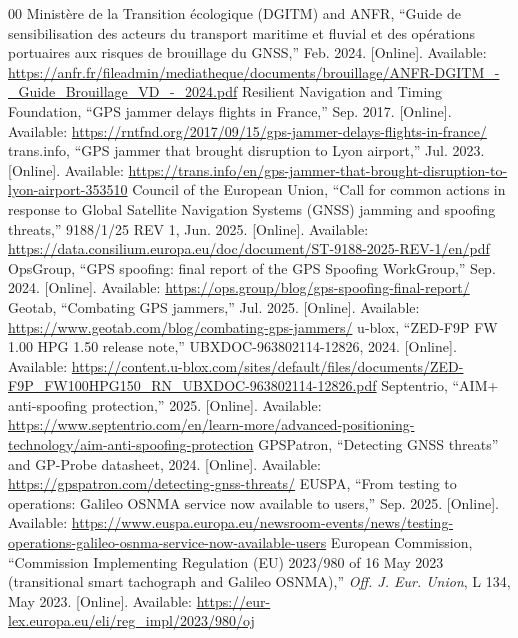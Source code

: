 \documentclass[conference]{IEEEtran}
\begin{document}
\begin{thebibliography}{00}
 Minist\`ere de la Transition \'ecologique (DGITM) and ANFR, ``Guide de sensibilisation des acteurs du transport maritime et fluvial et des op\'erations portuaires aux risques de brouillage du GNSS,'' Feb. 2024. [Online]. Available: \url{https://anfr.fr/fileadmin/mediatheque/documents/brouillage/ANFR-DGITM_-_Guide_Brouillage_VD_-_2024.pdf}
 Resilient Navigation and Timing Foundation, ``GPS jammer delays flights in France,'' Sep. 2017. [Online]. Available: \url{https://rntfnd.org/2017/09/15/gps-jammer-delays-flights-in-france/}
 trans.info, ``GPS jammer that brought disruption to Lyon airport,'' Jul. 2023. [Online]. Available: \url{https://trans.info/en/gps-jammer-that-brought-disruption-to-lyon-airport-353510}
 Council of the European Union, ``Call for common actions in response to Global Satellite Navigation Systems (GNSS) jamming and spoofing threats,'' 9188/1/25 REV 1, Jun. 2025. [Online]. Available: \url{https://data.consilium.europa.eu/doc/document/ST-9188-2025-REV-1/en/pdf}
 OpsGroup, ``GPS spoofing: final report of the GPS Spoofing WorkGroup,'' Sep. 2024. [Online]. Available: \url{https://ops.group/blog/gps-spoofing-final-report/}
 Geotab, ``Combating GPS jammers,'' Jul. 2025. [Online]. Available: \url{https://www.geotab.com/blog/combating-gps-jammers/}
 u-blox, ``ZED-F9P FW 1.00 HPG 1.50 release note,'' UBXDOC-963802114-12826, 2024. [Online]. Available: \url{https://content.u-blox.com/sites/default/files/documents/ZED-F9P_FW100HPG150_RN_UBXDOC-963802114-12826.pdf}
 Septentrio, ``AIM+ anti-spoofing protection,'' 2025. [Online]. Available: \url{https://www.septentrio.com/en/learn-more/advanced-positioning-technology/aim-anti-spoofing-protection}
 GPSPatron, ``Detecting GNSS threats'' and GP-Probe datasheet, 2024. [Online]. Available: \url{https://gpspatron.com/detecting-gnss-threats/}
 EUSPA, ``From testing to operations: Galileo OSNMA service now available to users,'' Sep. 2025. [Online]. Available: \url{https://www.euspa.europa.eu/newsroom-events/news/testing-operations-galileo-osnma-service-now-available-users}
 European Commission, ``Commission Implementing Regulation (EU) 2023/980 of 16 May 2023 (transitional smart tachograph and Galileo OSNMA),'' \emph{Off. J. Eur. Union}, L 134, May 2023. [Online]. Available: \url{https://eur-lex.europa.eu/eli/reg_impl/2023/980/oj}

\end{thebibliography}
\end{document}
